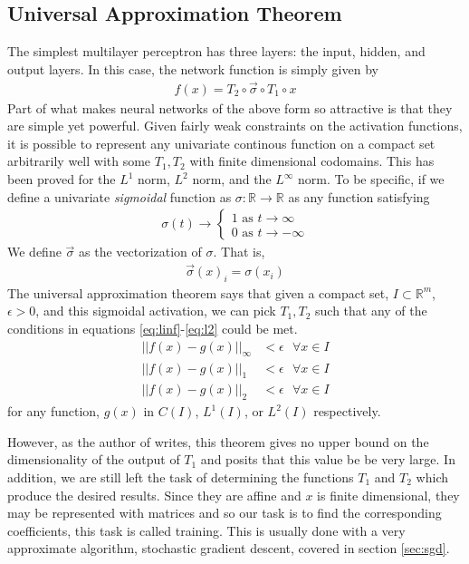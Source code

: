 \subsection{Universal Approximation Theorem}
The simplest multilayer perceptron has three layers: the input, hidden, and output layers.  In this case, the network function is simply given by
\begin{align}
f(x) = T_2 \circ \vec{\sigma} \circ T_1 \circ x
\end{align}
Part of what makes neural networks of the above form so attractive is that they are simple yet powerful.  Given fairly weak constraints on the activation functions, it is possible to represent any univariate continous function on a compact set arbitrarily well with some $T_1,T_2$ with finite dimensional codomains. \cite{gc89} This has been proved for the $L^1$ norm, $L^2$ norm, and the $L^\infty$ norm.  To be specific, if we define a univariate \textit{sigmoidal} function as $\sigma: \mathbb{R}\rightarrow \mathbb{R}$ as any function satisfying
\begin{align}
\sigma(t) \rightarrow
\begin{cases}
1 \text{ as } t\rightarrow \infty\\
0 \text{ as } t\rightarrow -\infty
\end{cases}
\end{align}
We define $\vec{\sigma}$ as the vectorization of $\sigma$.  That is, 
\begin{align}
\vec{\sigma}(x)_i = \sigma(x_i)
\end{align}
The universal approximation theorem says that given a compact set, $I\subset \mathbb{R}^m$, $\epsilon > 0$, and this sigmoidal activation, we can pick $T_1,T_2$ such that any of the conditions in equations \ref{eq:linf}-\ref{eq:l2} could be met.
\begin{align}
\label{eq:linf}||f(x) - g(x)||_\infty &< \epsilon \text{ } \forall x\in I \\
\label{eq:l1}||f(x) - g(x)||_1 &< \epsilon \text{ } \forall x\in I\\
\label{eq:l2}||f(x) - g(x)||_2 &< \epsilon \text{ } \forall x\in I
\end{align}
for any function, $g(x)$ in $C(I)$, $L^1(I)$, or $L^2(I)$ respectively.

However, as the author of \cite{gc89} writes, this theorem gives no upper bound on the dimensionality of the output of $T_1$ and posits that this value be be very large.  In addition, we are still left the task of determining the functions $T_1$ and $T_2$ which produce the desired results.  Since they are affine and $x$ is finite dimensional, they may be represented with matrices and so our task is to find the corresponding coefficients, this task is called training.  This is usually done with a very approximate algorithm, stochastic gradient descent, covered in section \ref{sec:sgd}.  

